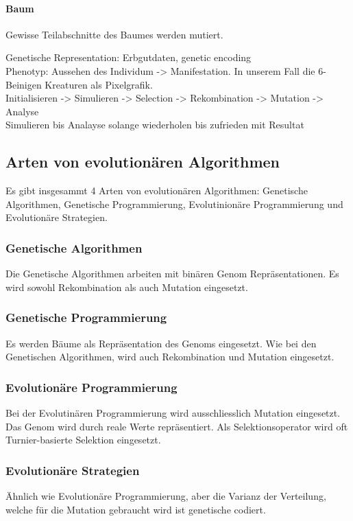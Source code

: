       \paragraph{Baum}
        Gewisse Teilabschnitte des Baumes werden mutiert.


    Genetische Representation: Erbgutdaten, genetic encoding \\
    Phenotyp: Aussehen des Individum -> Manifestation. In unserem Fall die 6-Beinigen Kreaturen als Pixelgrafik. \\
    Initialisieren -> Simulieren -> Selection -> Rekombination -> Mutation -> Analyse \\
    Simulieren bis Analayse solange wiederholen bis zufrieden mit Resultat


  \subsection{Arten von evolutionären Algorithmen}
  \label{sub:artenEvAlgos}
    Es gibt insgesammt 4 Arten von evolutionären Algorithmen:
    Genetische Algorithmen, Genetische Programmierung, Evolutinionäre Programmierung
    und Evolutionäre Strategien.

    \subsubsection{Genetische Algorithmen}
    \label{item:genAlgo}
      Die Genetische Algorithmen arbeiten mit binären Genom Repräsentationen.
      Es wird sowohl Rekombination als auch Mutation eingesetzt.

    \subsubsection{Genetische Programmierung}
    \label{item:genProg}
      Es werden Bäume als Repräsentation des Genoms eingesetzt. Wie bei den Genetischen Algorithmen,
      wird auch Rekombination und Mutation eingesetzt.

    \subsubsection{Evolutionäre Programmierung}
    \label{item:evProg}
      Bei der Evolutinären Programmierung wird ausschliesslich Mutation eingesetzt.
      Das Genom wird durch reale Werte repräsentiert. Als Selektionsoperator wird
      oft Turnier-basierte Selektion eingesetzt.

    \subsubsection{Evolutionäre Strategien}
    \label{item:evStrat}
        Ähnlich wie Evolutionäre Programmierung, aber die Varianz der Verteilung,
        welche für die Mutation gebraucht wird ist genetische codiert.
